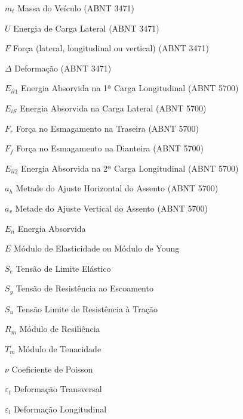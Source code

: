 
\begin{simbolos}
	\item [$m_t$] Massa do Veículo (ABNT 3471)
    \item [$U$] Energia de Carga Lateral (ABNT 3471)
    \item [$F$] Força (lateral, longitudinal ou vertical) (ABNT 3471)
    \item [$\Delta$] Deformação (ABNT 3471)
    \item [$E_{il1}$] Energia Absorvida na 1ª Carga Longitudinal (ABNT 5700)
	\item [$E_{iS}$] Energia Absorvida na Carga Lateral (ABNT 5700)
	\item [$F_r$] Força no Esmagamento na Traseira (ABNT 5700)
	\item [$F_f$] Força no Esmagamento na Dianteira (ABNT 5700)
	\item [$E_{il2}$] Energia Absorvida na 2ª Carga Longitudinal (ABNT 5700)
    \item [$a_h$] Metade do Ajuste Horizontal do Assento (ABNT 5700) 
    \item [$a_v$] Metade do Ajuste Vertical do Assento (ABNT 5700)
    \item [$E_n$] Energia Absorvida
    \item [$E$] Módulo de Elasticidade ou Módulo de Young
    \item [$S_e$] Tensão de Limite Elástico
    \item [$S_y$] Tensão de Resistência ao Escoamento
    \item [$S_u$] Tensão Limite de Resistência à Tração
    \item [$R_m$] Módulo de Resiliência
    \item [$T_m$] Módulo de Tenacidade
    \item [$\nu$] Coeficiente de Poisson
    \item [$\varepsilon_t$] Deformação Transversal
    \item [$\varepsilon_l$] Deformação Longitudinal

\end{simbolos}


